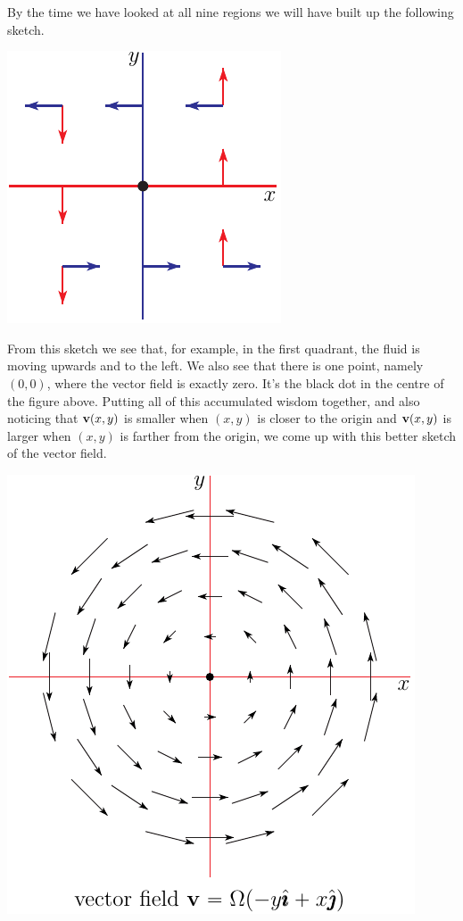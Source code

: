 \begin{eg}
\begin{itemize}
\end{itemize}
By the time we have looked at all nine regions we will have built up the
following sketch.
\begin{fig}\label{fig:vortexCrude}
\begin{center}
    \includegraphics{phaseVortex1.pdf}
\end{center}
\end{fig}
\noindent
From this sketch we see that, for example, in the first quadrant, 
the fluid is moving upwards and to the left. We also see that there is one 
point, namely $(0,0)$, where the vector field is exactly zero. It's the
black dot in the centre of the figure above.
Putting all of this 
accumulated wisdom together, and also noticing that $\mathbf{v}(x,y)$ is smaller 
when $(x,y)$ is closer to the origin and $\mathbf{v}(x,y)$ is larger when 
$(x,y)$ is farther from the origin, we come up with this better 
sketch of the vector field.
\begin{fig}\label{fig:vortexField}
\begin{center}
    \includegraphics{vortexField.pdf}

\end{center}
\end{fig}
\end{eg}

